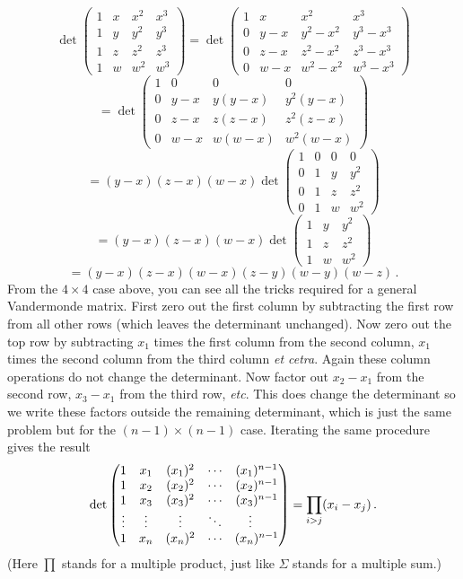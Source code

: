 \begin{enumerate}
$$
\det \begin{pmatrix}1 & x & x^2 & x^3\\ 1 & y& y^2 & y^3\\ 1 & z & z^2 & z^3\\ 1 & w & w^2 & w^3\end{pmatrix}
=
\det \begin{pmatrix}1 & x & x^2 & x^3\\ 0 & y-x& y^2-x^2 & y^3-x^3\\ 0 & z-x & z^2 -x^2& z^3-x^3\\ 0 & w-x & w^2-x^2 & w^3-x^3\end{pmatrix}
$$
$$
=
\det \begin{pmatrix}1 & 0 & 0 & 0\\ 0 & y-x& y(y-x)& y^2(y-x)\\ 0 & z-x & z(z-x) & z^2(z-x)\\ 0 & w-x & w(w-x) & w^2(w-x)\end{pmatrix}
$$
$$=
(y-x)(z-x)(w-x)\det \begin{pmatrix}1 & 0 & 0 & 0\\ 0 & 1& y& y^2\\ 0 & 1 & z & z^2\\ 0 & 1 & w & w^2\end{pmatrix}
$$
$$
=(y-x)(z-x)(w-x)\det \begin{pmatrix}1 & y & y^2\\ 1 & z&z^2\\ 1& w&w^2\end{pmatrix}
$$
$$
=(y-x)(z-x)(w-x) (z-y)(w-y)(w-z)\, .
$$
From the $4\times 4$ case above, you can see all the tricks required for a general Vandermonde matrix.
First zero out the first column by subtracting the first row from all other rows (which leaves the determinant unchanged). Now zero out the top row by subtracting $x_1$ times the first column from the second column,
$x_1$ times the second column from the third column {\it et cetra}. Again these column operations do not
change the determinant. Now factor out $x_2-x_1$ from the second row, $x_3-x_1$ from the third row, {\it etc}. This does change the determinant so we write these factors outside the remaining determinant, which is just the same problem but for the $(n-1)\times(n-1)$ case. Iterating the same procedure gives the result
$$
\det \begin{pmatrix}1 & x_1 & (x_1)^2 & \cdots &(x_1)^{n-1}\\ 
1 & x_2& (x_2)^2 & \cdots &  (x_2)^{n-1}\\ 
1 & x_3& (x_3)^2 & \cdots &  (x_3)^{n-1}\\ 
\mc\vdots &\mc\vdots &\mc\vdots &\ddots & \mc\vdots\ \ \  \\ 
1 & x_n& (x_n)^2 & \cdots &  (x_n)^{n-1}\end{pmatrix}
=\prod_{i>j}(x_i-x_j)\, .
$$
(Here $\prod$ stands for a multiple product, just like $\Sigma$ stands for a multiple sum.)


\end{enumerate}
